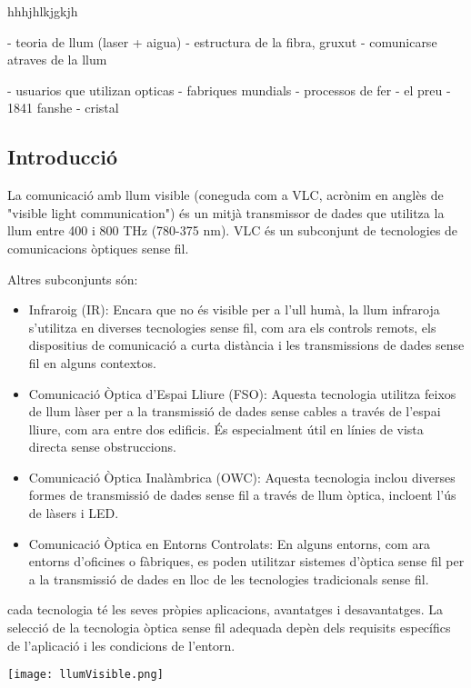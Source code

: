 

hhhjhlkjgkjh

- teoria de llum (laser + aigua)
- estructura de la fibra, gruxut
- comunicarse atraves de la llum

- usuarios que utilizan opticas
- fabriques mundials
- processos de fer
- el preu
- 1841 fanshe
- cristal

\subsection*{Introducció}
La comunicació amb llum visible (coneguda com a VLC, acrònim en anglès de "visible light communication") és un mitjà transmissor de dades que utilitza la llum entre 400 i 800 THz (780-375 nm). VLC és un subconjunt de tecnologies de comunicacions òptiques sense fil.

Altres subconjunts són:
\begin{itemize}
    \item Infraroig (IR): Encara que no és visible per a l'ull humà, la llum infraroja s'utilitza en diverses tecnologies sense fil, com ara els controls remots, els dispositius de comunicació a curta distància i les transmissions de dades sense fil en alguns contextos.
    \item Comunicació Òptica d'Espai Lliure (FSO): Aquesta tecnologia utilitza feixos de llum làser per a la transmissió de dades sense cables a través de l'espai lliure, com ara entre dos edificis. És especialment útil en línies de vista directa sense obstruccions.
    \item Comunicació Òptica Inalàmbrica (OWC): Aquesta tecnologia inclou diverses formes de transmissió de dades sense fil a través de llum òptica, incloent l'ús de làsers i LED.
    \item Comunicació Òptica en Entorns Controlats: En alguns entorns, com ara entorns d'oficines o fàbriques, es poden utilitzar sistemes d'òptica sense fil per a la transmissió de dades en lloc de les tecnologies tradicionals sense fil.
\end{itemize}

cada tecnologia té les seves pròpies aplicacions, avantatges i desavantatges. La selecció de la tecnologia òptica sense fil adequada depèn dels requisits específics de l'aplicació i les condicions de l'entorn.

\begin{center}
    \texttt{[image: llumVisible.png]}\\\vfill
\end{center}


